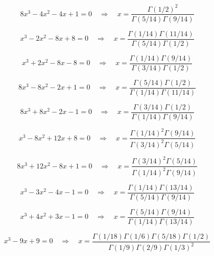 \documentclass[11pt,a4paper]{article}
\begin{document}
\begin{equation}\label{eq:68}
8x^{3} - 4x^{2} - 4x + 1 = 0 \quad \Rightarrow \quad x = \frac{\Gamma(1/2)^2}{\Gamma(5/14)\Gamma(9/14)}
\end{equation}

\begin{equation}\label{eq:69}
x^{3} - 2x^{2} - 8x + 8 = 0 \quad \Rightarrow \quad x = \frac{\Gamma(1/14)\Gamma(11/14)}{\Gamma(5/14)\Gamma(1/2)}
\end{equation}

\begin{equation}\label{eq:70}
x^{3} + 2x^{2} - 8x - 8 = 0 \quad \Rightarrow \quad x = \frac{\Gamma(1/14)\Gamma(9/14)}{\Gamma(3/14)\Gamma(1/2)}
\end{equation}

\begin{equation}\label{eq:71}
8x^{3} - 8x^{2} - 2x + 1 = 0 \quad \Rightarrow \quad x = \frac{\Gamma(5/14)\Gamma(1/2)}{\Gamma(1/14)\Gamma(11/14)}
\end{equation}

\begin{equation}\label{eq:72}
8x^{3} + 8x^{2} - 2x - 1 = 0 \quad \Rightarrow \quad x = \frac{\Gamma(3/14)\Gamma(1/2)}{\Gamma(1/14)\Gamma(9/14)}
\end{equation}

\begin{equation}\label{eq:73}
x^{3} - 8x^{2} + 12x + 8 = 0 \quad \Rightarrow \quad x = \frac{\Gamma(1/14)^2\Gamma(9/14)}{\Gamma(3/14)^2\Gamma(5/14)}
\end{equation}

\begin{equation}\label{eq:74}
8x^{3} + 12x^{2} - 8x + 1 = 0 \quad \Rightarrow \quad x = \frac{\Gamma(3/14)^2\Gamma(5/14)}{\Gamma(1/14)^2\Gamma(9/14)}
\end{equation}

\begin{equation}\label{eq:75}
x^{3} - 3x^{2} - 4x - 1 = 0 \quad \Rightarrow \quad x = \frac{\Gamma(1/14)\Gamma(13/14)}{\Gamma(5/14)\Gamma(9/14)}
\end{equation}

\begin{equation}\label{eq:76}
x^{3} + 4x^{2} + 3x - 1 = 0 \quad \Rightarrow \quad x = \frac{\Gamma(5/14)\Gamma(9/14)}{\Gamma(1/14)\Gamma(13/14)}
\end{equation}

\begin{equation}\label{eq:77}
x^{3} - 9x + 9 = 0 \quad \Rightarrow \quad x = \frac{\Gamma(1/18)\Gamma(1/6)\Gamma(5/18)\Gamma(1/2)}{\Gamma(1/9)\Gamma(2/9)\Gamma(1/3)^2}
\end{equation}
\end{document}
